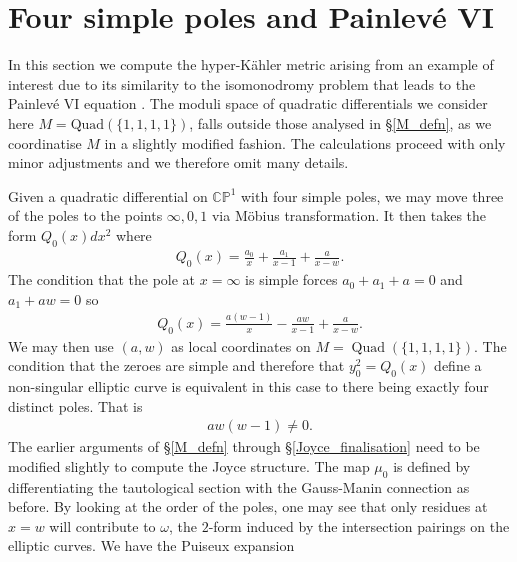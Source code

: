 \documentclass[a4paper,12pt,reqno]{amsart}
\numberwithin{equation}{section}
\numberwithin{counter2}{section}
\begin{document}
\section{Four simple poles and Painlev\'e VI} \label{PVI}
In this section we compute the hyper-K\"ahler metric arising from an example of interest due to its similarity to the isomonodromy problem that leads to the Painlev\'e VI equation \cite{O}.  The moduli space of quadratic differentials we consider here $M = \text{Quad}(\{1,1,1,1\})$,  falls outside those analysed in \S \ref{M_defn},  as we coordinatise $M$ in a slightly modified fashion.  The calculations proceed with only minor adjustments and we therefore omit many details.  \par 
Given a quadratic differential on $\mathbb{CP}^1$ with four simple poles,  we may move three of the poles to the points $\infty,  0,  1$ via M\"obius transformation.  It then takes the form $Q_0(x)dx^2$ where
\begin{align}
Q_0(x) = \frac{a_0}{x} + \frac{a_1}{x-1} +\frac{a}{x-w}. 
\end{align}
The condition that the pole at $x = \infty$ is simple forces $a_0 + a_1 + a = 0$ and $a_1 + aw = 0$ so
\begin{align}\label{PVIQ0}
Q_0(x) = \frac{a(w-1)}{x} - \frac{aw}{x-1} +\frac{a}{x-w}.  
\end{align}
 We may then use $(a,w)$ as local coordinates on $M = \operatorname{Quad}(\{1,1,1,1\})$.  The condition that the zeroes are simple and therefore that $y_0^2 = Q_0(x)$  define a non-singular elliptic curve is equivalent in this case to there being exactly four distinct poles.  That is
 \begin{align}
 aw(w-1) \ne 0.  
 \end{align}
 The earlier arguments of \S \ref{M_defn} through \S \ref{Joyce_finalisation} need to be modified slightly to compute the Joyce structure.  The map $\mu_0$ is defined by differentiating the tautological section with the Gauss-Manin connection as before.  By looking at the order of the poles,  one may see that only residues at $x = w$ will contribute to $\omega$,  the $2$-form induced by the intersection pairings on the elliptic curves.  
 We have the Puiseux expansion
\end{document}
